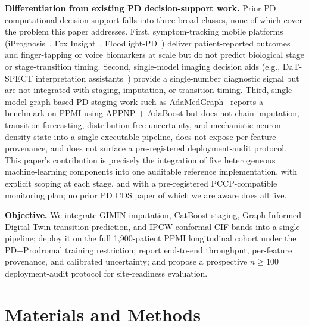 \textbf{Differentiation from existing PD decision-support work.} Prior PD computational decision-support falls into three broad classes, none of which cover the problem this paper addresses. First, symptom-tracking mobile platforms (iPrognosis~\cite{iprognosis2020}, Fox Insight~\cite{foxinsight2020}, Floodlight-PD~\cite{floodlight2021}) deliver patient-reported outcomes and finger-tapping or voice biomarkers at scale but do not predict biological stage or stage-transition timing. Second, single-model imaging decision aids (e.g., DaT-SPECT interpretation assistants~\cite{seibyl2008dat}) provide a single-number diagnostic signal but are not integrated with staging, imputation, or transition timing. Third, single-model graph-based PD staging work such as AdaMedGraph~\cite{lian2024adamedgraph} reports a benchmark on PPMI using APPNP + AdaBoost but does not chain imputation, transition forecasting, distribution-free uncertainty, and mechanistic neuron-density state into a single executable pipeline, does not expose per-feature provenance, and does not surface a pre-registered deployment-audit protocol. This paper's contribution is precisely the integration of five heterogeneous machine-learning components into one auditable reference implementation, with explicit scoping at each stage, and with a pre-registered PCCP-compatible monitoring plan; no prior PD CDS paper of which we are aware does all five.

\textbf{Objective.} We integrate GIMIN imputation, CatBoost staging, Graph-Informed Digital Twin transition prediction, and IPCW conformal CIF bands into a single pipeline; deploy it on the full 1,900-patient PPMI longitudinal cohort under the PD+Prodromal training restriction; report end-to-end throughput, per-feature provenance, and calibrated uncertainty; and propose a prospective $n \geq 100$ deployment-audit protocol for site-readiness evaluation.

\section{Materials and Methods}
\label{p6:sec:methods}

